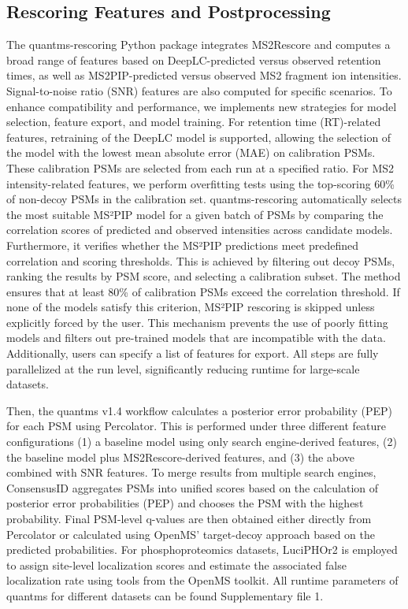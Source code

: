 \documentclass[12pt]{article}
\begin{document}
\subsection{Rescoring Features and Postprocessing}
 The quantms-rescoring Python package integrates MS2Rescore and computes a broad range of features based on DeepLC-predicted versus observed retention times, as well as MS2PIP-predicted versus observed MS2 fragment ion intensities. Signal-to-noise ratio (SNR) features are also computed for specific scenarios. To enhance compatibility and performance, we implements new strategies for model selection, feature export, and model training. For retention time (RT)-related features, retraining of the DeepLC model is supported, allowing the selection of the model with the lowest mean absolute error (MAE) on calibration PSMs. These calibration PSMs are selected from each run at a specified ratio. For MS2 intensity-related features, we perform overfitting tests using the top-scoring 60\% of non-decoy PSMs in the calibration set. quantms-rescoring automatically selects the most suitable MS²PIP model for a given batch of PSMs by comparing the correlation scores of predicted and observed intensities across candidate models. Furthermore, it verifies whether the MS²PIP predictions meet predefined correlation and scoring thresholds. This is achieved by filtering out decoy PSMs, ranking the results by PSM score, and selecting a calibration subset. The method ensures that at least 80\% of calibration PSMs exceed the correlation threshold. If none of the models satisfy this criterion, MS²PIP rescoring is skipped unless explicitly forced by the user. This mechanism prevents the use of poorly fitting models and filters out pre-trained models that are incompatible with the data. Additionally, users can specify a list of features for export. All steps are fully parallelized at the run level, significantly reducing runtime for large-scale datasets.
 
 Then, the quantms v1.4 workflow calculates a posterior error probability (PEP) for each PSM using Percolator. This is performed under three different feature configurations (1) a baseline model using only search engine-derived features, (2) the baseline model plus MS2Rescore-derived features, and (3) the above combined with SNR features. To merge results from multiple search engines, ConsensusID aggregates PSMs into unified scores based on the calculation of posterior error probabilities (PEP) and chooses the PSM with the highest probability. Final PSM-level q-values are then obtained either directly from Percolator or calculated using OpenMS' target-decoy approach based on the predicted probabilities. For phosphoproteomics datasets, LuciPHOr2 is employed to assign site-level localization scores and estimate the associated false localization rate using tools from the OpenMS toolkit. All runtime parameters of quantms for different datasets can be found Supplementary file 1.
\end{document}
